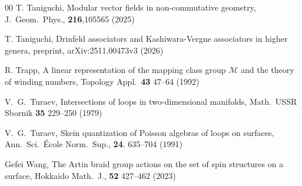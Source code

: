 \documentclass[a4paper,12pt, twoside]{amsart}
\theoremstyle{definition}
\theoremstyle{remark}
\numberwithin{equation}{section}
\begin{document}
\begin{thebibliography}{00}
T. Taniguchi,
Modular vector fields in non-commutative geometry, 
J.\  Geom.\ Phys., \textbf{216},105565 (2025)

T. Taniguchi,
Drinfeld associators and Kashiwara-Vergne associators in higher genera, preprint, arXiv:2511.00473v3 (2026)


R. Trapp,
A linear representation of the mapping class group $\mathcal{M}$ and the theory of winding numbers,
Topology Appl.\ \textbf{43} 47--64 (1992)

V.\ G.\ Turaev, 
Intersections of loops in two-dimensional manifolds,
Math.\, USSR Sbornik \textbf{35} 229--250 (1979)

V.\ G.\ Turaev, 
Skein quantization of Poisson algebras of loops on surfaces, 
Ann.\ Sci.\ \'Ecole Norm.\ Sup., \textbf{24}. 635--704  (1991)

Gefei Wang, 
The Artin braid group actions on the set of spin structures on a surface, 
Hokkaido Math.\ J., \textbf{52} 427--462 (2023)



\end{thebibliography}
\end{document}
